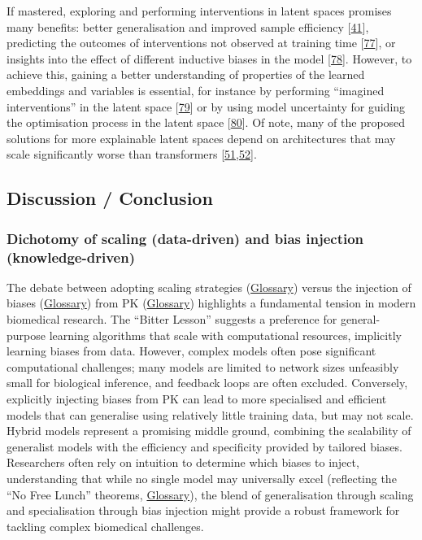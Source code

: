 If mastered, exploring and performing interventions in latent spaces promises many benefits: better generalisation and improved sample efficiency {[}\protect\hyperlink{ref-T7D6XA6s}{41}{]}, predicting the outcomes of interventions not observed at training time {[}\protect\hyperlink{ref-MhOZ3PWC}{77}{]}, or insights into the effect of different inductive biases in the model {[}\protect\hyperlink{ref-FVLAWGsX}{78}{]}.
However, to achieve this, gaining a better understanding of properties of the learned embeddings and variables is essential, for instance by performing ``imagined interventions'' in the latent space {[}\protect\hyperlink{ref-r5mjeIhV}{79}{]} or by using model uncertainty for guiding the optimisation process in the latent space {[}\protect\hyperlink{ref-eEfUqiI4}{80}{]}.
Of note, many of the proposed solutions for more explainable latent spaces depend on architectures that may scale significantly worse than transformers {[}\protect\hyperlink{ref-6W1y3ZrT}{51},\protect\hyperlink{ref-OlEfQKqu}{52}{]}.

\hypertarget{discussion-conclusion}{%
\subsection{Discussion / Conclusion}\label{discussion-conclusion}}

\hypertarget{dichotomy-of-scaling-data-driven-and-bias-injection-knowledge-driven}{%
\subsubsection{Dichotomy of scaling (data-driven) and bias injection (knowledge-driven)}\label{dichotomy-of-scaling-data-driven-and-bias-injection-knowledge-driven}}

The debate between adopting scaling strategies (\protect\hyperlink{scaling-hypothesis}{Glossary}) versus the injection of biases (\protect\hyperlink{bias-machine-learning}{Glossary}) from PK (\protect\hyperlink{prior-knowledge-1}{Glossary}) highlights a fundamental tension in modern biomedical research.
The ``Bitter Lesson'' suggests a preference for general-purpose learning algorithms that scale with computational resources, implicitly learning biases from data.
However, complex models often pose significant computational challenges; many models are limited to network sizes unfeasibly small for biological inference, and feedback loops are often excluded.
Conversely, explicitly injecting biases from PK can lead to more specialised and efficient models that can generalise using relatively little training data, but may not scale.
Hybrid models represent a promising middle ground, combining the scalability of generalist models with the efficiency and specificity provided by tailored biases.
Researchers often rely on intuition to determine which biases to inject, understanding that while no single model may universally excel (reflecting the ``No Free Lunch'' theorems, \protect\hyperlink{no-free-lunch-theorems}{Glossary}), the blend of generalisation through scaling and specialisation through bias injection might provide a robust framework for tackling complex biomedical challenges.

